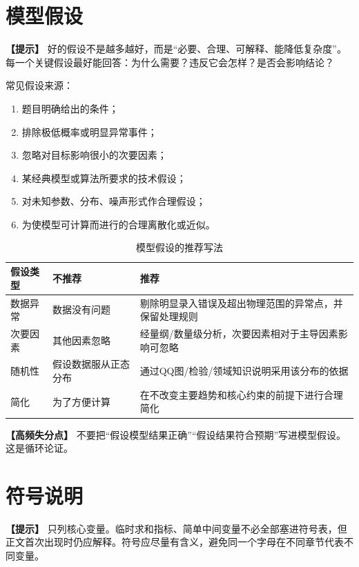 \documentclass[12pt,a4paper]{article}
\newcommand{\tip}[1]{\par\noindent\textbf{【提示】} #1\par}
\newcommand{\warning}[1]{\par\noindent\textbf{【高频失分点】} #1\par}
\begin{document}
\section{模型假设}

\tip{好的假设不是越多越好，而是“必要、合理、可解释、能降低复杂度”。每一个关键假设最好能回答：为什么需要？违反它会怎样？是否会影响结论？} 常见假设来源：
\begin{enumerate}[label=(\arabic*)]
  \item 题目明确给出的条件；
  \item 排除极低概率或明显异常事件；
  \item 忽略对目标影响很小的次要因素；
  \item 某经典模型或算法所要求的技术假设；
  \item 对未知参数、分布、噪声形式作合理假设；
  \item 为使模型可计算而进行的合理离散化或近似。
\end{enumerate}

\begin{table}[H]
\centering
\caption{模型假设的推荐写法}
\begin{tabular}{p{2cm}p{5cm}p{6cm}}
\toprule
假设类型 & 不推荐 & 推荐 \\
\midrule
数据异常 & 数据没有问题 & 剔除明显录入错误及超出物理范围的异常点，并保留处理规则 \\
次要因素 & 其他因素忽略 & 经量纲/数量级分析，次要因素相对于主导因素影响可忽略 \\
随机性 & 假设数据服从正态分布 & 通过QQ图/检验/领域知识说明采用该分布的依据 \\
简化 & 为了方便计算 & 在不改变主要趋势和核心约束的前提下进行合理简化 \\
\bottomrule
\end{tabular}
\end{table}

\warning{不要把“假设模型结果正确”“假设结果符合预期”写进模型假设。这是循环论证。}

\section{符号说明}

\tip{只列核心变量。临时求和指标、简单中间变量不必全部塞进符号表，但正文首次出现时仍应解释。符号应尽量有含义，避免同一个字母在不同章节代表不同变量。}
\end{document}

